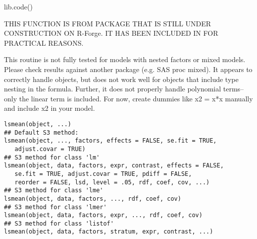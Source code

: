 \documentclass[a4paper]{book}
\begin{document}
%
\begin{Examples}
\begin{ExampleCode}

lib.code()

\end{ExampleCode}
\end{Examples}
\newpage
{}
%
\begin{Description}\relax
THIS FUNCTION IS FROM PACKAGE  THAT IS STILL UNDER CONSTRUCTION ON
R-Forge. IT HAS BEEN INCLUDED IN  FOR PRACTICAL REASONS.

 This routine is not fully tested for models with nested
factors or mixed models. Please check results against another
package (e.g. SAS proc mixed). It appears to correctly handle 
objects, but does
not work well for  objects that include 
type nesting in the formula. Further, it does not properly handle
polynomial terms--only the linear term is included. For now, create
dummies like x2 = x*x manually and include x2 in your model. 
\end{Description}
%
\begin{Usage}
\begin{verbatim}
lsmean(object, ...)
## Default S3 method:
lsmean(object, ..., factors, effects = FALSE, se.fit = TRUE,
   adjust.covar = TRUE)
## S3 method for class 'lm'
lsmean(object, data, factors, expr, contrast, effects = FALSE,
   se.fit = TRUE, adjust.covar = TRUE, pdiff = FALSE, 
   reorder = FALSE, lsd, level = .05, rdf, coef, cov, ...)
## S3 method for class 'lme'
lsmean(object, data, factors, ..., rdf, coef, cov)
## S3 method for class 'lmer'
lsmean(object, data, factors, expr, ..., rdf, coef, cov)
## S3 method for class 'listof'
lsmean(object, data, factors, stratum, expr, contrast, ...)
\end{verbatim}
\end{Usage}
%
\end{document}
